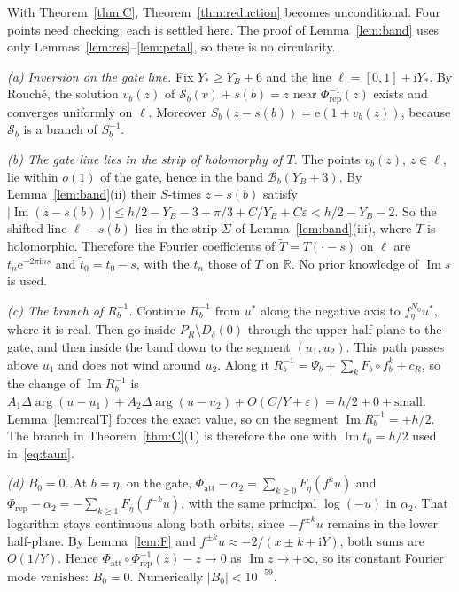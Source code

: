 \documentclass[11pt]{amsart}
\theoremstyle{definition}
\newcommand{\Rr}{R}
\newcommand{\eee}{\mathrm{e}}
\newcommand{\ii}{\mathrm{i}}
\begin{document}
With Theorem~\ref{thm:C}, Theorem~\ref{thm:reduction} becomes unconditional.
Four points need checking; each is settled here.  The proof of
Lemma~\ref{lem:band} uses only Lemmas~\ref{lem:res}--\ref{lem:petal}, so there is
no circularity.

\emph{(a) Inversion on the gate line.}  Fix $Y_*\ge Y_B+6$ and the line
$\ell=[0,1]+\ii Y_*$.  By Rouch\'e, the solution $v_b(z)$ of
$\mathcal S_b(v)+s(b)=z$ near $\Phi_{\mathrm{rep}}^{-1}(z)$ exists and converges
uniformly on $\ell$.  Moreover $S_b(z-s(b))=\eee(1+v_b(z))$, because $\mathcal S_b$
is a branch of $S_b^{-1}$.

\emph{(b) The gate line lies in the strip of holomorphy of $T$.}  The points
$v_b(z)$, $z\in\ell$, lie within $o(1)$ of the gate, hence in the band $\mathcal B_b(Y_B+3)$.
By Lemma~\ref{lem:band}(ii) their $S$-times $z-s(b)$ satisfy
$|\operatorname{Im}(z-s(b))|\le h/2-Y_B-3+\pi/3+C/Y_B+C\varepsilon<h/2-Y_B-2$.  So the
shifted line $\ell-s(b)$ lies in the strip $\Sigma$ of Lemma~\ref{lem:band}(iii),
where $T$ is holomorphic.  Therefore the Fourier coefficients of
$\tilde T=T(\cdot-s)$ on $\ell$ are $t_n\eee^{-2\pi\ii ns}$ and
$\tilde t_0=t_0-s$, with the $t_n$ those of $T$ on $\mathbb R$.  No prior
knowledge of $\operatorname{Im}s$ is used.

\emph{(c) The branch of $\Rr_b^{-1}$.}  Continue $\Rr_b^{-1}$ from $u^*$ along
the negative axis to $f_\eta^{N_0}u^*$, where it is real.  Then go inside
$P_R\setminus D_\delta(0)$ through the upper half-plane to the gate, and then
inside the band down to the segment $(u_1,u_2)$.  This path passes above $u_1$
and does not wind around $u_2$.  Along it $\Rr_b^{-1}=\Psi_b+\sum_kF_b\circ f_b^k+c_R$, so the change of
$\operatorname{Im}\Rr_b^{-1}$ is
$A_1\Delta\arg(u-u_1)+A_2\Delta\arg(u-u_2)+O(C/Y+\varepsilon)=h/2+0+\text{small}$.
Lemma~\ref{lem:realT} forces the exact value, so on the segment
$\operatorname{Im}\Rr_b^{-1}=+h/2$.  The branch in
Theorem~\ref{thm:C}(1) is therefore the one with $\operatorname{Im}t_0=h/2$ used
in~\eqref{eq:taun}.

\emph{(d) $B_0=0$.}  At $b=\eta$, on the gate,
$\Phi_{\mathrm{att}}-\alpha_2=\sum_{k\ge0}F_\eta(f^ku)$ and
$\Phi_{\mathrm{rep}}-\alpha_2=-\sum_{k\ge1}F_\eta(f^{-k}u)$, with the same
principal $\log(-u)$ in $\alpha_2$.  That logarithm stays continuous along both
orbits, since $-f^{\pm k}u$ remains in the lower half-plane.  By
Lemma~\ref{lem:F} and $f^{\pm k}u\approx-2/(x\pm k+\ii Y)$, both sums are
$O(1/Y)$.  Hence $\Phi_{\mathrm{att}}\circ\Phi_{\mathrm{rep}}^{-1}(z)-z\to0$ as
$\operatorname{Im}z\to+\infty$, so its constant Fourier mode vanishes:
$B_0=0$.  Numerically $|B_0|<10^{-59}$.
\end{document}

